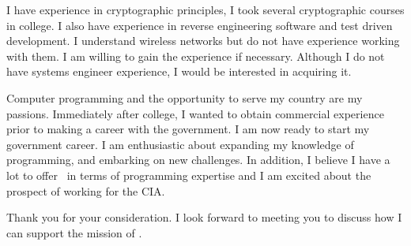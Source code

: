 \documentclass{my_cv}
\begin{document}
I have experience in cryptographic principles, I took several cryptographic courses in college.  I also have experience in reverse engineering software and test driven development.  I understand wireless networks but do not have experience working with them.  I am willing to gain the experience if necessary.  Although I do not have systems engineer experience, I would be interested in acquiring it.

\iffalse
I love teaching, I started a Youtube channel in 2011, Apple Juice Teaching, that has over 1,000,000 views and 5,000 loyal subscribers.  I loved teaching everyone how to code and how to set up there development environment.  I was a teaching assistant for two years at Virginia Tech and had hands-on experience working with students and planning lessons with the teachers.  Nothing brings me more pleasure than helping students learn.

I love C programming.  My time at Virginia Tech made me very fluent in C and Linux.  I made a shell implementation, wrote our own malloc implemention, and a web server.  Learning how to debug, read assembly, weally taught me what object oriented programming languages are built on and taught me a core understanding of computer science.  I also took a multi-threading class that extensively covered p threads.  I also made a Youtube channel which taught C programming to any public user.

I have experience as an entrepreneur running my own website.  I learned how to use test driven development with Ruby on Rails with the database Postgres.  I learned how to use components of AWS, such as S3 and SES.  Writing all the software on my end taught me how to manage code and the importance of testing.  The importance of team work can not be understated at any company, a rising tide lifts all boats in the pier.
\fi

Computer programming and the opportunity to serve my country are my passions.  Immediately after college,
 I wanted to obtain commercial experience prior to making a career with the government.
 I am now ready to start my government career.  I am enthusiastic about expanding my
knowledge of programming, and embarking on new challenges.  In addition, I
believe I have a lot to offer \companyName \ in terms of programming expertise and
I am excited about the prospect of working for the CIA.

Thank you for your consideration.  I look forward to meeting you to discuss how
I can support the mission of \companyName.

\makeletterclosing
\end{document}
